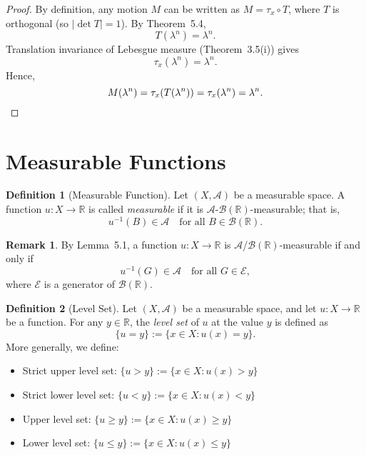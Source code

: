 \documentclass[12pt]{article}
\theoremstyle{definition}
\newtheorem{definition}{Definition}[section]
\newtheorem{remark}{Remark}[section]
\begin{document}
\begin{proof}
By definition, any motion \( M \) can be written as \( M = \tau_x \circ T \), where \( T \) is orthogonal (so \( |\det T| = 1 \)). By Theorem~5.4,
\[
T(\lambda^n) = \lambda^n.
\]
Translation invariance of Lebesgue measure (Theorem~3.5(i)) gives
\[
\tau_x(\lambda^n) = \lambda^n.
\]
Hence,
\[
M(\lambda^n) = \tau_x(T(\lambda^n)) = \tau_x(\lambda^n) = \lambda^n. \qedhere
\]
\end{proof}

\vspace{3em}
\section{Measurable Functions}

\begin{definition}[Measurable Function]
Let \( (X, \mathcal{A}) \) be a measurable space. A function \( u : X \to \mathbb{R} \) is called \emph{measurable} if it is \( \mathcal{A} \)-\( \mathcal{B}(\mathbb{R}) \)-measurable; that is,
\[
u^{-1}(B) \in \mathcal{A} \quad \text{for all } B \in \mathcal{B}(\mathbb{R}).
\]
\end{definition}

\medskip
\begin{remark}
By Lemma~5.1, a function \( u : X \to \mathbb{R} \) is \( \mathcal{A} \)/\( \mathcal{B}(\mathbb{R}) \)-measurable if and only if
\[
u^{-1}(G) \in \mathcal{A} \quad \text{for all } G \in \mathcal{E},
\]
where \( \mathcal{E} \) is a generator of \( \mathcal{B}(\mathbb{R}) \).
\end{remark}

\medskip
\begin{definition}[Level Set]
Let \( (X, \mathcal{A}) \) be a measurable space, and let \( u : X \to \mathbb{R} \) be a function.  
For any \( y \in \mathbb{R} \), the \emph{level set} of \( u \) at the value \( y \) is defined as
\[
\{ u = y \} := \{ x \in X : u(x) = y \}.
\]
More generally, we define:

\begin{itemize}
    \item Strict upper level set: \quad \( \{ u > y \} := \{ x \in X : u(x) > y \} \)
    \item Strict lower level set: \quad \( \{ u < y \} := \{ x \in X : u(x) < y \} \)
    \item Upper level set: \quad \( \{ u \geq y \} := \{ x \in X : u(x) \geq y \} \)
    \item Lower level set: \quad \( \{ u \leq y \} := \{ x \in X : u(x) \leq y \} \)
\end{itemize}
\end{definition}
\end{document}
